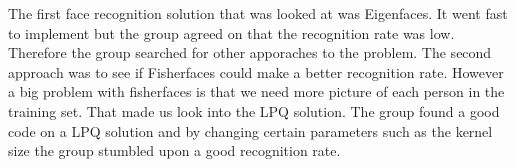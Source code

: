 The first face recognition solution that was looked at was Eigenfaces. It went fast to implement but the group agreed on that the recognition rate was low. Therefore the group searched for other apporaches to the problem. The second approach was to see if Fisherfaces could make a better recognition rate. However a big problem with fisherfaces is that we need more picture of each person in the training set. That made us look into the LPQ solution. The group found a good code on a LPQ solution and by changing certain parameters such as the kernel size the group stumbled upon a good recognition rate.